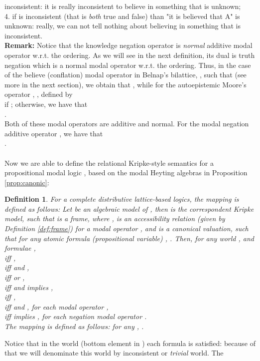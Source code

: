 \documentclass[10pt,twocolumn]{article}
\newtheorem{definition}{Definition}
\begin{document}
  inconsistent: it is really inconsistent to believe in something
  that is unknown;\\
 4.  if  is inconsistent (that is \emph{both} true and false) than "it is believed that A" is
  unknown: really, we can not tell nothing about believing in something that is
  inconsistent.\\
  \textbf{Remark:} Notice that the knowledge negation operator  is \emph{normal} additive modal
  operator w.r.t. the  ordering. As we will see in the next
  definition, its dual is truth negation  which is
  a normal modal operator w.r.t. the  ordering.
 Thus, in the case of the believe
(conflation) modal operator  in Belnap's bilattice,
,  such that  (see more in the next section), we
obtain that , while for the autoepistemic Moore's operator
\cite{Gins88}, ,  defined by\\  if ;  otherwise, we have that\\
 .\\
Both of these modal operators are additive and normal. For the modal
negation additive operator , we have that\\
.
\\\\
Now we are able to define the relational Kripke-style semantics for
a propositional modal logic , based on the modal Heyting
algebras in Proposition \ref{prop:canonic}:
\begin{definition} \label{def:kmodel} For a complete distributive lattice-based logics, the mapping  is defined as follows:
 Let   be an algebraic model of , then  is the correspondent
  Kripke model, such that  is a frame, where ,    is an
accessibility relation (given by Definition \ref{def:frame}) for a
modal operator , and  is
 a canonical valuation, such that for any atomic formula (propositional
variable) , .
Then, for any
world , and formulae , \\
 iff ,\\
 iff 
and ,\\
 iff 
or ,\\
 iff  and  implies  ,\\
 iff ,\\
  iff  and , for each modal operator ,\\
 iff  implies ,
for each negation modal operator .\\
 The mapping  is defined as follows: for any , .
\end{definition}
Notice that in the world  (bottom element in ) each
formula  is satisfied: because of that we will
denominate this world by inconsistent or \emph{trivial} world. The
\end{document}

